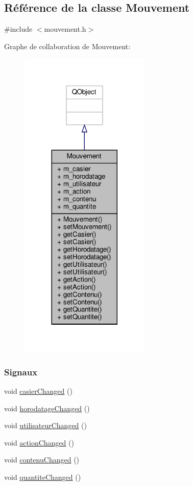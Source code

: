 \hypertarget{class_mouvement}{}\subsection{Référence de la classe Mouvement}
\label{class_mouvement}


{\ttfamily \#include $<$mouvement.\+h$>$}



Graphe de collaboration de Mouvement\+:\nopagebreak
\begin{figure}[H]
\begin{center}
\leavevmode
\includegraphics[width=176pt]{class_mouvement__coll__graph}
\end{center}
\end{figure}
\subsubsection*{Signaux}
\begin{DoxyCompactItemize}
\item 
void \hyperlink{class_mouvement_ae91304e04f2fdc7cc6e5b6cfe0796fb3}{casier\+Changed} ()
\item 
void \hyperlink{class_mouvement_a08d9242a25862702b483ed2f0a3c92e8}{horodatage\+Changed} ()
\item 
void \hyperlink{class_mouvement_a0bfec3a89baffcee5d35e3c3e5a6256a}{utilisateur\+Changed} ()
\item 
void \hyperlink{class_mouvement_a85298817bf89c88362f1b9b6478b5d87}{action\+Changed} ()
\item 
void \hyperlink{class_mouvement_ad9451ba92231f84fe9659e4d73d6ff41}{contenu\+Changed} ()
\item 
void \hyperlink{class_mouvement_a256e46ab458dccb15b3e631ed239f2d0}{quantite\+Changed} ()
\end{DoxyCompactItemize}

